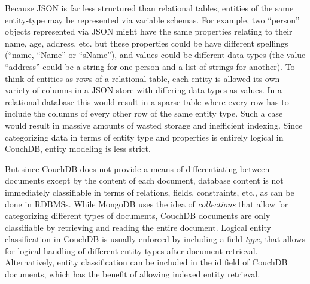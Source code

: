 Because JSON is far less structured than relational tables, entities of the same entity-type may be represented via variable schemas. For example, two ``person'' objects represented via JSON might have the same properties relating to their name, age, address, etc. but these properties could be have different spellings (``name, ``Name'' or ``sName''), and values could be different data types (the value ``address'' could be a string for one person and a list of strings for another). To think of entities as rows of a relational table, each entity is allowed its own variety of columns in a JSON store with differing data types as values. In a relational database this would result in a sparse table where every row has to include the columns of every other row of the same entity type. Such a case would result in massive amounts of wasted storage and inefficient indexing. Since categorizing data in terms of entity type and properties is entirely logical in CouchDB, entity modeling is less strict.

But since CouchDB does not provide a means of differentiating between documents except by the content of each document, database content is not immediately classifiable in terms of relations, fields, constraints, etc., as can be done in RDBMSs. While MongoDB uses the idea of \textit{collections} that allow for categorizing different types of documents, CouchDB documents are only classifiable by retrieving and reading the entire document. Logical entity classification in CouchDB is usually enforced by including a field \textit{type}, that allows for logical handling of different entity types after document retrieval. Alternatively, entity classification can be included in the id field of CouchDB documents, which has the benefit of allowing indexed entity retrieval.